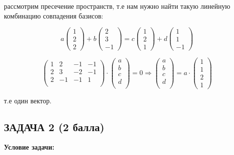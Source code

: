 \documentclass[a4paper,12pt]{article}
\begin{document}
рассмотрим пресечение пространств, т.е нам нужно найти такую линейную комбинацию совпадения базисов:

\[
a \begin{pmatrix}1 \\ 2 \\ 2\end{pmatrix} + b \begin{pmatrix}2 \\ 3 \\ -1\end{pmatrix} = c \begin{pmatrix}1 \\ 2 \\ 1\end{pmatrix} + d \begin{pmatrix}1 \\ 1 \\ -1\end{pmatrix}
\]

\[
\begin{pmatrix}
    1& 2& -1& -1 \\
    2& 3& -2& -1 \\
    2& -1& -1& 1\\
\end{pmatrix} \cdot \begin{pmatrix}
    a \\
    b \\
    c \\
    d \\
\end{pmatrix} = 0 \Rightarrow \begin{pmatrix}
    a \\
    b \\
    c \\
    d \\
\end{pmatrix} = a\cdot
\begin{pmatrix}
    1 \\
    1 \\
    2 \\
    1
\end{pmatrix}
\]

т.е один вектор.

\vspace{1cm}

\subsection{ЗАДАЧА 2 \hfill \textbf{(2 балла)}}
\textbf{Условие задачи:}
\end{document}
